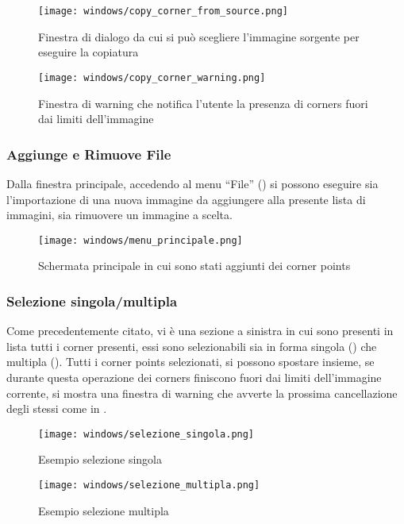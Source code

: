 \begin{figure}[H]
    \centering
    \texttt{[image: windows/copy\_corner\_from\_source.png]}
    \caption{Finestra di dialogo da cui si può scegliere l'immagine sorgente per eseguire la copiatura}
    \label{fig:14}
\end{figure}

\begin{figure}[H]
    \centering
    \texttt{[image: windows/copy\_corner\_warning.png]}
    \caption{Finestra di warning che notifica l'utente la presenza di corners fuori dai limiti dell'immagine}
    \label{fig:15}
\end{figure}

\subsubsection{Aggiunge e Rimuove File}
\noindent Dalla finestra principale, accedendo al menu ``File'' () si possono eseguire sia l'importazione di una nuova immagine da aggiungere alla presente lista di immagini, sia rimuovere un immagine a scelta.

\begin{figure}[H]
    \centering
    \texttt{[image: windows/menu\_principale.png]}
    \caption{Schermata principale in cui sono stati aggiunti dei corner points}
    \label{fig:16}
\end{figure}

\subsubsection{Selezione singola/multipla}
\noindent Come precedentemente citato, vi è una sezione a sinistra in cui sono presenti in lista tutti i corner presenti, essi sono selezionabili sia in forma singola () che multipla (). Tutti i corner points selezionati, si possono spostare insieme, se durante questa operazione dei corners finiscono fuori dai limiti dell'immagine corrente, si mostra una finestra di warning che avverte la prossima cancellazione degli stessi come in .

\begin{figure}[H]
    \centering
    \texttt{[image: windows/selezione\_singola.png]}
    \caption{Esempio selezione singola}
    \label{fig:17}
\end{figure}

\begin{figure}[H]
    \centering
    \texttt{[image: windows/selezione\_multipla.png]}
    \caption{Esempio selezione multipla}
    \label{fig:18}
\end{figure}

